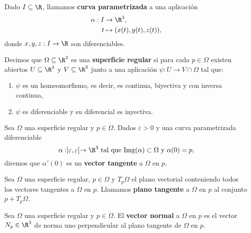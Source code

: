 \begin{definicion}
    Dado $I\subseteq \R$, llamamos \textbf{curva parametrizada} a una aplicación
    \begin{align*}
        \alpha: I &\to \R^3,\\
        t &\mapsto (x(t), y(t), z(t)),
    \end{align*}
    donde $x,y,z:I\to \R$ son diferenciables. 
\end{definicion}
\begin{definicion}
    Decimos que $\Omega \subseteq \R^3$ es una \textbf{superficie regular} si para cada $p\in \Omega$ existen abiertos $U\subseteq \R^2$ y $V\subseteq \R^3$ junto a una aplicación $\psi\colon U \to V\cap \Omega$ tal que:
    \begin{enumerate}
        \item $\psi$ es un homeomorfismo, es decir, es continua, biyectiva y con inversa continua,
        \item $\psi$ es diferenciable y su diferencial es inyectiva.
    \end{enumerate}
\end{definicion}

\begin{definicion}
    Sea $\Omega$ una superficie regular y $p\in \Omega$. Dados $\varepsilon>0$ y una curva parametrizada diferenciable
    $$\alpha: ]\varepsilon, \varepsilon[ \to \R^3 \text{ tal que } \text{Img($\alpha$)} \subset \Omega \text{ y } \alpha(0)=p,$$
    diremos que $\alpha'(0)$ es un \textbf{vector tangente} a $\Omega$ en $p$.
\end{definicion}
\begin{definicion}
    Sea $\Omega$ una superficie regular, $p\in \Omega$ y $T_p\Omega$ el plano vectorial conteniendo todos los vectores tangentes a $\Omega$ en $p$. Llamamos \textbf{plano tangente} a $\Omega$ en $p$ al conjunto $p+T_p\Omega$.
\end{definicion}
\begin{definicion}
    Sea $\Omega$ una superficie regular y $p\in \Omega$. El \textbf{vector normal} a $\Omega$ en $p$ es el vector $N_p\in \R^3$ de norma uno perpendicular al plano tangente de $\Omega$ en $p$.
\end{definicion}



